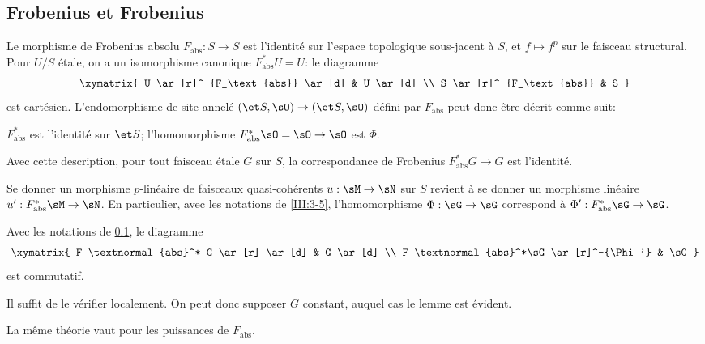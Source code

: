 \subsection{Frobenius et Frobenius}\label{III:3-4}

Le morphisme de Frobenius absolu $F_\text{abs}:S\to S$ est l'identité sur 
l'espace topologique sous-jacent à $S$, et $f\mapsto f^p$ sur le faisceau 
structural. Pour $U/S$ étale, on a un isomorphisme canonique 
$F_\text{abs}^* U=U$: le diagramme 
\[\xymatrix{
  U \ar[r]^-{F_\text{abs}} \ar[d] 
    & U \ar[d] \\
  S \ar[r]^-{F_\text{abs}} 
    & S
}\]
est cartésien. L'endomorphisme de site annelé 
$(\et S,\sO)\to(\et S,\sO)$ défini par $F_\text{abs}$ peut donc 
être décrit comme suit:
\begin{center}
  $F_\text{abs}^*$ est l'identité sur $\et S$; l'homomorphisme 
  $F_\text{abs}^*\sO=\sO\to\sO$ est $\Phi$.
\end{center}
Avec cette description, pour tout faisceau étale $G$ sur $S$, la 
correspondance de Frobenius $F_\text{abs}^*G\to G$ est l'identité. 

Se donner un morphisme $p$-linéaire de faisceaux quasi-cohérents 
$u:\sM\to\sN$ sur $S$ revient à se donner un morphisme linéaire 
$u':F_\text{abs}^*\sM\to\sN$. En particulier, avec les notations de 
\ref{III:3-5}, l'homomorphisme $\Phi:\sG\to\sG$ correspond à 
$\Phi':F_\text{abs}^*\sG\to\sG$. 





\begin{lemma_}\label{III:3-5}
Avec les notations de \ref{III:3-4}, le diagramme 
\[\xymatrix{
  F_\textnormal{abs}^* G \ar[r] \ar[d] 
    & G \ar[d] \\
  F_\textnormal{abs}^*\sG \ar[r]^-{\Phi'} 
    & \sG 
}\]
est commutatif.
\end{lemma_}

Il suffit de le vérifier localement. On peut donc supposer $G$ constant, 
auquel cas le lemme est évident. 

La même théorie vaut pour les puissances de $F_\text{abs}$.





\subsection{}\label{III:3-6}

